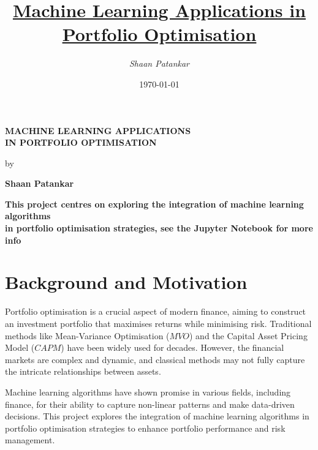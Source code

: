 \documentclass[a4paper,12pt,titlepage]{article}
\title{\underline{\textbf{Machine Learning Applications in Portfolio Optimisation}}}
\author{\textit{Shaan Patankar}}
\date{\today}
\numberwithin{equation}{section}
\begin{document}
\begin{titlepage}
	\begin{center}
		\vspace*{-3cm}
		\vfill
		\vspace{3mm}
		{\LARGE\textbf{MACHINE LEARNING APPLICATIONS\\
		IN PORTFOLIO OPTIMISATION\\}}

		\vspace{0.8cm}
		by\\
		\vspace{0.8cm}

		{\LARGE\textbf{Shaan Patankar}}

		\vspace{1.5cm}
		\vfill
		\vspace{5cm}
		\textbf{
			This project centres on exploring the integration of machine learning algorithms\\
			in portfolio optimisation strategies, see the Jupyter Notebook for more info 
			}
	\end{center}
\end{titlepage}

\newpage
\tableofcontents
{}
\thispagestyle{fancy}
\newpage

\clearpage
{}
\pagestyle{fancy}

\section{Background and Motivation}
\label{Background and Motivation}

Portfolio optimisation is a crucial aspect of modern finance, aiming to construct an investment 
portfolio that maximises returns while minimising risk. Traditional methods like Mean-Variance 
Optimisation ($MVO$) and the Capital Asset Pricing Model ($CAPM$) have been widely used for decades. However, 
the financial markets are complex and dynamic, and classical methods may not fully capture the 
intricate relationships between assets. \newline \par \noindent Machine learning algorithms have 
shown promise in various fields, including finance, for their ability to capture non-linear patterns 
and make data-driven decisions. This project explores the integration of machine learning algorithms 
in portfolio optimisation strategies to enhance portfolio performance and risk management.
\end{document}
